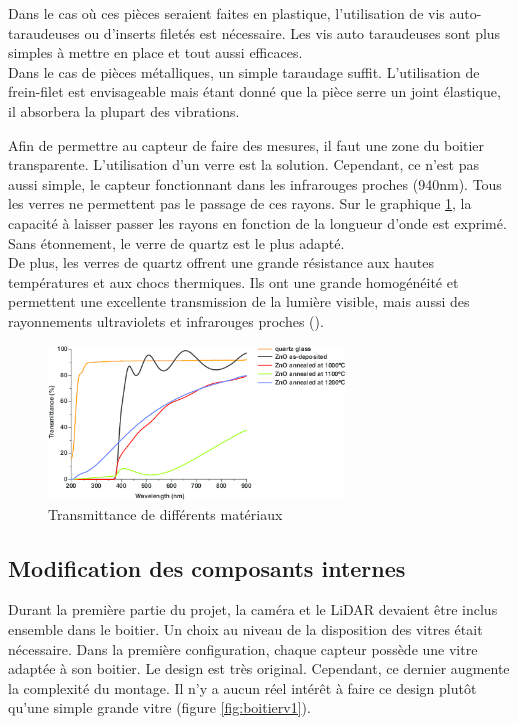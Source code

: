 Dans le cas où ces pièces seraient faites en plastique, l’utilisation de vis auto-taraudeuses ou d’inserts 
filetés est nécessaire. Les vis auto taraudeuses sont plus simples à mettre en place et tout aussi 
efficaces. \\
Dans le cas de pièces métalliques, un simple taraudage suffit. L’utilisation de frein-filet est envisageable 
mais étant donné que la pièce serre un joint élastique, il absorbera la plupart des vibrations.\par 
Afin de permettre au capteur de faire des mesures, il faut une zone du boitier transparente. L’utilisation 
d'un verre est la solution. Cependant, ce n’est pas aussi simple, le capteur fonctionnant dans les infrarouges proches 
(940nm). Tous les verres ne permettent pas le passage de ces rayons. Sur le graphique \ref{fig:wavelength},
la capacité à laisser passer les rayons en fonction de la longueur d’onde est exprimé. Sans étonnement,
le verre de quartz est le plus adapté.\\
De plus, les verres de quartz offrent une grande résistance aux hautes températures et aux chocs 
thermiques. Ils ont une grande homogénéité et permettent une excellente transmission de la lumière visible, mais 
aussi des rayonnements ultraviolets et infrarouges proches (\cite{wave}).

\begin{figure}[H]
    \centering
    \includegraphics[width=0.7\textwidth]{Images/photos_PGA/wavelength.png}
    \caption{Transmittance de différents matériaux}
    \label{fig:wavelength}
\end{figure}

\subsection{Modification des composants internes}

Durant la première partie du projet, la caméra et le LiDAR devaient être inclus ensemble dans le boitier. 
Un choix au niveau de la disposition des vitres était nécessaire. Dans la première configuration, 
chaque capteur possède une vitre adaptée à son boitier. Le design est très original. Cependant, ce dernier 
augmente la complexité du montage. Il n’y a aucun réel intérêt à faire ce design plutôt 
qu’une simple grande vitre (figure \ref{fig:boitierv1}).

